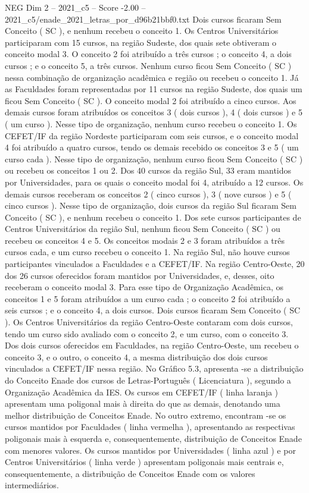 \begin{textsample}{NEG Dim 2 – 2021\_c5 – Score -2.00 – 2021\_c5/enade\_2021\_letras\_por\_d96b21bbf0.txt}
Dois cursos ficaram Sem Conceito ( SC ), e nenhum recebeu o conceito 1.
Os Centros Universitários participaram com 15 cursos, na região Sudeste, dos quais sete obtiveram o conceito modal 3.
O conceito 2 foi atribuído a três cursos ; o conceito 4, a dois cursos ; e o conceito 5, a três cursos.
Nenhum curso ficou Sem Conceito ( SC ) nessa combinação de organização acadêmica e região ou recebeu o conceito 1.
Já as Faculdades foram representadas por 11 cursos na região Sudeste, dos quais um ficou Sem Conceito ( SC ).
O conceito modal 2 foi atribuído a cinco cursos.
Aos demais cursos foram atribuídos os conceitos 3 ( dois cursos ), 4 ( dois cursos ) e 5 ( um curso ).
Nesse tipo de organização, nenhum curso recebeu o conceito 1.
Os CEFET/IF da região Nordeste participaram com seis cursos, e o conceito modal 4 foi atribuído a quatro cursos, tendo os demais recebido os conceitos 3 e 5 ( um curso cada ).
Nesse tipo de organização, nenhum curso ficou Sem Conceito ( SC ) ou recebeu os conceitos 1 ou 2.
Dos 40 cursos da região Sul, 33 eram mantidos por Universidades, para os quais o conceito modal foi 4, atribuído a 12 cursos.
Os demais cursos receberam os conceitos 2 ( cinco cursos ), 3 ( nove cursos ) e 5 ( cinco cursos ).
Nesse tipo de organização, dois cursos da região Sul ficaram Sem Conceito ( SC ), e nenhum recebeu o conceito 1.
Dos sete cursos participantes de Centros Universitários da região Sul, nenhum ficou Sem Conceito ( SC ) ou recebeu os conceitos 4 e 5.
Os conceitos modais 2 e 3 foram atribuídos a três cursos cada, e um curso recebeu o conceito 1.
Na região Sul, não houve cursos participantes vinculados a Faculdades e a CEFET/IF.
Na região Centro-Oeste, 20 dos 26 cursos oferecidos foram mantidos por Universidades, e, desses, oito receberam o conceito modal 3.
Para esse tipo de Organização Acadêmica, os conceitos 1 e 5 foram atribuídos a um curso cada ; o conceito 2 foi atribuído a seis cursos ; e o conceito 4, a dois cursos.
Dois cursos ficaram Sem Conceito ( SC ).
Os Centros Universitários da região Centro-Oeste contaram com dois cursos, tendo um curso sido avaliado com o conceito 2, e um curso, com o conceito 3.
Dos dois cursos oferecidos em Faculdades, na região Centro-Oeste, um recebeu o conceito 3, e o outro, o conceito 4, a mesma distribuição dos dois cursos vinculados a CEFET/IF nessa região.
No Gráfico 5.3, apresenta -se a distribuição do Conceito Enade dos cursos de Letras-Português ( Licenciatura ), segundo a Organização Acadêmica da IES.
Os cursos em CEFET/IF ( linha laranja ) apresentam uma poligonal mais à direita do que as demais, denotando uma melhor distribuição de Conceitos Enade.
No outro extremo, encontram -se os cursos mantidos por Faculdades ( linha vermelha ), apresentando as respectivas poligonais mais à esquerda e, consequentemente, distribuição de Conceitos Enade com menores valores.
Os cursos mantidos por Universidades ( linha azul ) e por Centros Universitários ( linha verde ) apresentam poligonais mais centrais e, consequentemente, a distribuição de Conceitos Enade com os valores intermediários.

\end{textsample}
